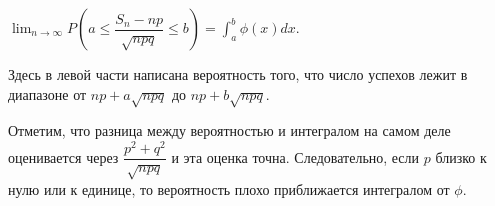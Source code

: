 \documentclass[a4paper]{article}
\begin{document}
\begin{colloq}
\begin{theorem}
		$\lim_{n \rightarrow \infty} P\left( a \leqslant \dfrac{S_n - np}{\sqrt{npq}} \leqslant b \right) = \int_a^b \phi(x) dx$.
		
		Здесь в левой части написана вероятность того, что число успехов лежит в диапазоне от $np + a\sqrt{npq}$ до $np + b\sqrt{npq}$.
	\end{theorem}

	Отметим, что разница между вероятностью и интегралом на самом деле оценивается через $\dfrac{p^2 + q^2}{\sqrt{npq}}$ и эта оценка точна. Следовательно, если $p$ близко к нулю или к единице, то	вероятность плохо приближается интегралом от $\phi$.

    \end{colloq}
\end{document}
